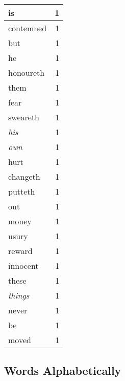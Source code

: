\begin{center}
\begin{longtable}{l|r}
is & 1 \\ \hline
contemned & 1 \\ \hline
but & 1 \\ \hline
he & 1 \\ \hline
honoureth & 1 \\ \hline
them & 1 \\ \hline
fear & 1 \\ \hline
sweareth & 1 \\ \hline
\emph{his} & 1 \\ \hline
\emph{own} & 1 \\ \hline
hurt & 1 \\ \hline
changeth & 1 \\ \hline
putteth & 1 \\ \hline
out & 1 \\ \hline
money & 1 \\ \hline
usury & 1 \\ \hline
reward & 1 \\ \hline
innocent & 1 \\ \hline
these & 1 \\ \hline
\emph{things} & 1 \\ \hline
never & 1 \\ \hline
be & 1 \\ \hline
moved & 1 \\ \hline
\end{longtable}
\end{center}



\normalsize



\subsection{Words Alphabetically}

